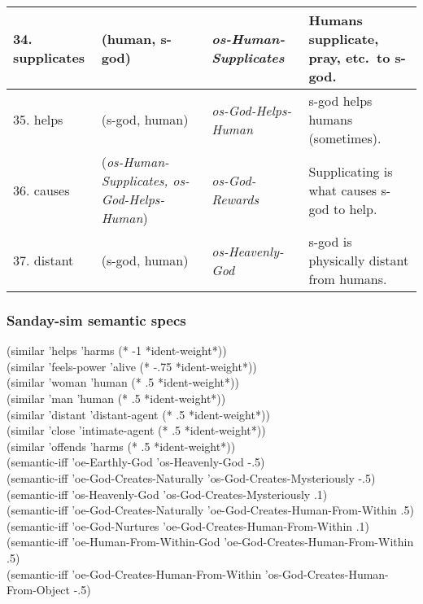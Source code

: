 \documentclass[12pt,xcolor=svgnames]{beamer}
\begin{document}
\begin{frame}
{{\begin{tabular}{llll}
\hline 34. supplicates &\hspace{-3ex} (human, s-god) &\hspace{-3ex}  \em os-Human-Supplicates &\hspace{-3ex} Humans supplicate, pray, etc.\ to s-god. \\
\hline 35. helps &\hspace{-3ex} (s-god, human) &\hspace{-3ex}  \em os-God-Helps-Human &\hspace{-3ex} s-god helps humans (sometimes). \\
\hline 36. causes &\hspace{-3ex} ({\em os-Human-Supplicates, os-God-Helps-Human}) &\hspace{-3ex}  \em os-God-Rewards &\hspace{-3ex} Supplicating is what causes s-god to help. \\
\hline 37. distant &\hspace{-3ex} (s-god, human) &\hspace{-3ex}  \em os-Heavenly-God &\hspace{-3ex} s-god is physically distant from humans. \\
\hline\hline
\end{tabular}}}
\end{frame}


\begin{frame}\frametitle{Sanday-sim semantic specs}
{\scriptsize
(similar 'helps 'harms (* -1 *ident-weight*))\\
(similar 'feels-power 'alive (* -.75 *ident-weight*))\\
(similar 'woman 'human (* .5 *ident-weight*))\\
(similar 'man 'human (* .5 *ident-weight*))\\
(similar 'distant 'distant-agent (* .5 *ident-weight*))\\
(similar 'close 'intimate-agent (* .5 *ident-weight*))\\
(similar 'offends 'harms (* .5 *ident-weight*))\\
(semantic-iff 'oe-Earthly-God 'os-Heavenly-God -.5)\\
(semantic-iff 'oe-God-Creates-Naturally 'os-God-Creates-Mysteriously -.5)\\
(semantic-iff 'os-Heavenly-God 'os-God-Creates-Mysteriously .1)\\
(semantic-iff 'oe-God-Creates-Naturally 'oe-God-Creates-Human-From-Within .5)\\
(semantic-iff 'oe-God-Nurtures 'oe-God-Creates-Human-From-Within .1)\\
(semantic-iff 'oe-Human-From-Within-God 'oe-God-Creates-Human-From-Within .5)\\
(semantic-iff 'oe-God-Creates-Human-From-Within 'os-God-Creates-Human-From-Object -.5)
}
\end{frame}
\end{document}
